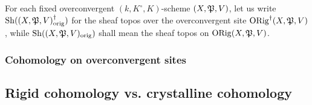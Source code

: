             \begin{convention}
                For each fixed overconvergent $(k, K^{\circ}, K)$-scheme $(X, \mathfrak{P}, V)$, let us write $\mathrm{Sh}((X, \mathfrak{P}, V)_{\mathrm{orig}}^{\dagger})$ for the sheaf topos over the overconvergent site $\mathrm{ORig}^{\dagger}(X, \mathfrak{P}, V)$, while $\mathrm{Sh}((X, \mathfrak{P}, V)_{\mathrm{orig}})$ shall mean the sheaf topos on $\mathrm{ORig}(X, \mathfrak{P}, V)$.
            \end{convention}
        
        \subsubsection{Cohomology on overconvergent sites}
        
    \subsection{Rigid cohomology vs. crystalline cohomology}
